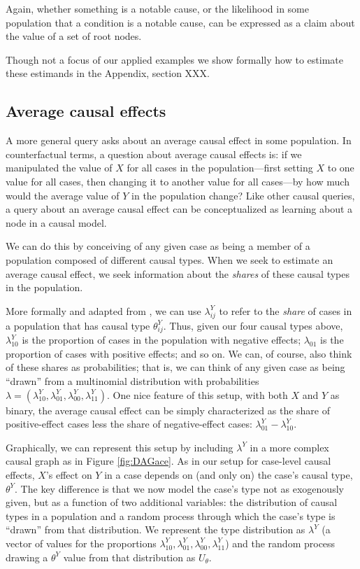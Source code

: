 \documentclass[12pt,]{book}
\begin{document}
Again, whether something is a notable cause, or the likelihood in some population that a condition is a notable cause, can be expressed as a claim about the value of a set of root nodes.

Though not a focus of our applied examples we show formally how to estimate these estimands in the Appendix, section XXX.

\hypertarget{average-causal-effects}{%
\subsection{Average causal effects}\label{average-causal-effects}}

A more general query asks about an average causal effect in some population. In counterfactual terms, a question about average causal effects is: if we manipulated the value of \(X\) for all cases in the population---first setting \(X\) to one value for all cases, then changing it to another value for all cases---by how much would the average value of \(Y\) in the population change? Like other causal queries, a query about an average causal effect can be conceptualized as learning about a node in a causal model.

We can do this by conceiving of any given case as being a member of a population composed of different causal types. When we seek to estimate an average causal effect, we seek information about the \emph{shares} of these causal types in the population.

More formally and adapted from \citet{humphreys2015mixing}, we can use \(\lambda^Y_{ij}\) to refer to the \emph{share} of cases in a population that has causal type \(\theta^Y_{ij}\). Thus, given our four causal types above, \(\lambda^Y_{10}\) is the proportion of cases in the population with negative effects; \(\lambda_{01}\) is the proportion of cases with positive effects; and so on. We can, of course, also think of these shares as probabilities; that is, we can think of any given case as being ``drawn'' from a multinomial distribution with probabilities \(\lambda = (\lambda^Y_{10}, \lambda^Y_{01}, \lambda^Y_{00}, \lambda^Y_{11})\). One nice feature of this setup, with both \(X\) and \(Y\) as binary, the average causal effect can be simply characterized as the share of positive-effect cases less the share of negative-effect cases: \(\lambda^Y_{01} - \lambda^Y_{10}\).

Graphically, we can represent this setup by including \(\lambda^Y\) in a more complex causal graph as in Figure \ref{fig:DAGace}. As in our setup for case-level causal effects, \(X\)'s effect on \(Y\) in a case depends on (and only on) the case's causal type, \(\theta^Y\). The key difference is that we now model the case's type not as exogenously given, but as a function of two additional variables: the distribution of causal types in a population and a random process through which the case's type is ``drawn'' from that distribution. We represent the type distribution as \(\lambda^Y\) (a vector of values for the proportions \(\lambda^Y_{10}, \lambda^Y_{01}, \lambda^Y_{00}, \lambda^Y_{11}\)) and the random process drawing a \(\theta^Y\) value from that distribution as \(U_\theta\).
\end{document}
